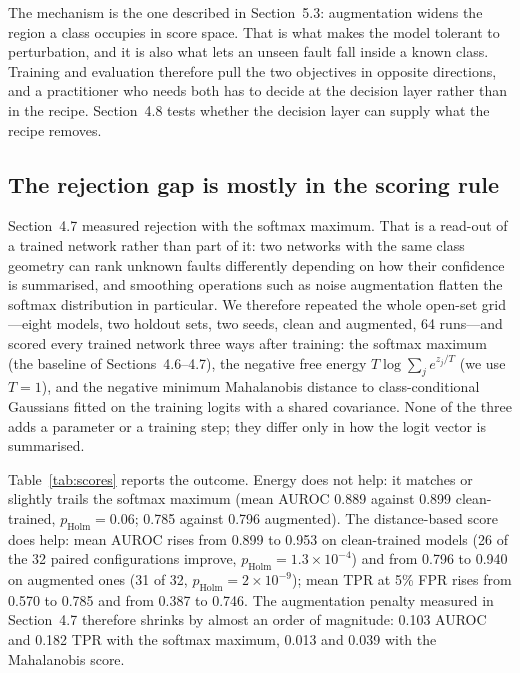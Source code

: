 The mechanism is the one described in Section~5.3: augmentation widens the region a class occupies in score space. That is what makes the model tolerant to perturbation, and it is also what lets an unseen fault fall inside a known class. Training and evaluation therefore pull the two objectives in opposite directions, and a practitioner who needs both has to decide at the decision layer rather than in the recipe. Section~4.8 tests whether the decision layer can supply what the recipe removes.

\subsection{The rejection gap is mostly in the scoring rule}
\label{sec:scores}

Section~4.7 measured rejection with the softmax maximum. That is a read-out of a trained network rather than part of it: two networks with the same class geometry can rank unknown faults differently depending on how their confidence is summarised, and smoothing operations such as noise augmentation flatten the softmax distribution in particular. We therefore repeated the whole open-set grid---eight models, two holdout sets, two seeds, clean and augmented, 64 runs---and scored every trained network three ways after training: the softmax maximum (the baseline of Sections~4.6--4.7), the negative free energy $T\log\sum_j e^{z_j/T}$ (we use $T=1$), and the negative minimum Mahalanobis distance to class-conditional Gaussians fitted on the training logits with a shared covariance. None of the three adds a parameter or a training step; they differ only in how the logit vector is summarised.

Table~\ref{tab:scores} reports the outcome. Energy does not help: it matches or slightly trails the softmax maximum (mean AUROC 0.889 against 0.899 clean-trained, $p_{\mathrm{Holm}} = 0.06$; 0.785 against 0.796 augmented). The distance-based score does help: mean AUROC rises from 0.899 to 0.953 on clean-trained models (26 of the 32 paired configurations improve, $p_{\mathrm{Holm}} = 1.3\times10^{-4}$) and from 0.796 to 0.940 on augmented ones (31 of 32, $p_{\mathrm{Holm}} = 2\times10^{-9}$); mean TPR at 5\% FPR rises from 0.570 to 0.785 and from 0.387 to 0.746. The augmentation penalty measured in Section~4.7 therefore shrinks by almost an order of magnitude: 0.103 AUROC and 0.182 TPR with the softmax maximum, 0.013 and 0.039 with the Mahalanobis score.

